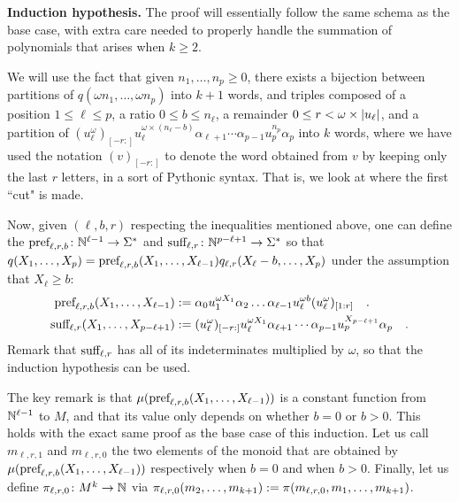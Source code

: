 \begin{proofof}
	\textbf{Induction hypothesis.}
	The proof will essentially follow the same schema as the base case,
	with extra care needed to properly handle the summation of polynomials
	that arises when $k \geq 2$.

	We will use the fact that given $n_1, \dots, n_p \geq 0$,
	there exists a bijection between
	partitions of $q(\omega n_1, \dots, \omega n_p)$
	into $k+1$ words, and
	triples composed of
	a position  $1 \leq \ell \leq p$,
	a ratio     $0 \leq b \leq n_\ell$,
	a remainder $0 \leq r < \omega \times \card{u_\ell}$,
	and a partition of
	$(u_\ell^\omega)_{[-r:]} u_\ell^{\omega \times (n_\ell - b)}
		\alpha_{\ell+1} \cdots \alpha_{p-1} u_p^{n_p} \alpha_{p}$
	into $k$ words,
	where we have used the notation
	$(v)_{[-r:]}$ to denote the word obtained from $v$
	by keeping only the last $r$ letters, in a sort of Pythonic syntax.
	That is, we look at where the first ``cut" is made.

	Now, given $(\ell, b, r)$ respecting the inequalities
	mentioned above,
	one can define the 
	$\text{pref}_{\ell,r,b} \colon \mathbb{N}^{\ell - 1} \to \Sigma^*$
	and
	$\text{suff}_{\ell,r} \colon \mathbb{N}^{p - \ell + 1} \to \Sigma^*$
	so that
	$q(X_1, \dots, X_p) = \text{pref}_{\ell,r,b}(X_1, \dots, X_{\ell-1})
		q_{\ell, r}(X_{\ell} - b, \dots, X_p)$
	under the assumption that $X_\ell \geq b$:
	\begin{align*}
        \text{pref}_{\ell,r,b}(X_1, \dots, X_{\ell - 1})
        &\mathrel{:=}
        \alpha_0 u_1^{\omega X_1} \alpha_2 \dots \alpha_{\ell - 1}
        u_\ell^{\omega b} (u_{\ell}^\omega)_{[1:r]}
        \quad .
        \\
		\text{suff}_{\ell,r}(X_{1}, \dots, X_{p - \ell + 1})
        &\mathrel{:=}
        (u_\ell^\omega)_{[-r:]} u_\ell^{\omega X_1}
		\alpha_{\ell+1} \cdots \alpha_{p-1} u_p^{X_{p - \ell + 1}} \alpha_{p}
		\quad .
	\end{align*}
	Remark that $\text{suff}_{\ell,r}$ has all of its indeterminates
	multiplied by $\omega$, so that the induction hypothesis
	can be used.

	The key remark is that $\mu(\text{pref}_{\ell,r,b}(X_1, \dots, X_{\ell - 1}))$ is a
	constant function from $\mathbb{N}^{\ell-1}$ to $M$, and that its value
	only depends on whether $b = 0$ or $b > 0$.
	This holds with
	the exact same proof as the base case of this induction. Let us call
	$m_{\ell,r,1}$ and $m_{\ell,r,0}$ the two elements of the monoid that are
	obtained by $\mu(\text{pref}_{\ell,r,b}(X_1, \dots, X_{\ell-1}))$ respectively when
	$b = 0$ and when $b > 0$. Finally, let us define $\pi_{\ell,r,0} \colon M^k
		\to \mathbb{N}$ via $\pi_{\ell,r,0}(m_2, \dots, m_{k+1}) \mathrel{:=}
		\pi(m_{\ell,r,0}, m_1, \dots, m_{k+1})$.


\end{proofof}
